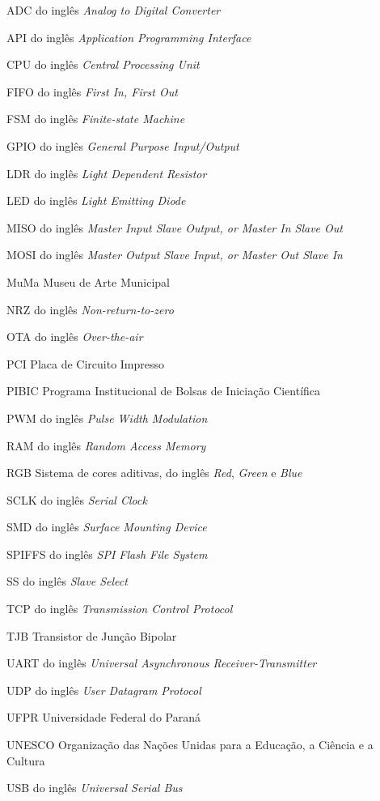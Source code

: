 \begin{siglas}
    \item[ADC] do inglês \emph{Analog to Digital Converter}
    \item[API] do inglês \emph{Application Programming Interface}
    \item[CPU] do inglês \emph{Central Processing Unit}
    \item[FIFO] do inglês \emph{First In, First Out}
    \item[FSM] do inglês \emph{Finite-state Machine}
    \item[GPIO] do inglês \emph{General Purpose Input/Output}
    \item[LDR] do inglês \emph{Light Dependent Resistor}
    \item[LED] do inglês \emph{Light Emitting Diode}
    \item[MISO] do inglês \emph{Master Input Slave Output, or Master In Slave Out}
    \item[MOSI] do inglês \emph{Master Output Slave Input, or Master Out Slave In}
    \item[MuMa] Museu de Arte Municipal
    \item[NRZ] do inglês \emph{Non-return-to-zero}
    \item[OTA] do inglês \emph{Over-the-air}
    \item[PCI] Placa de Circuito Impresso
    \item[PIBIC] Programa Institucional de Bolsas de Iniciação Científica
    \item[PWM] do inglês \emph{Pulse Width Modulation}
    \item[RAM] do inglês \emph{Random Access Memory}
    \item[RGB] Sistema de cores aditivas, do inglês \emph{Red}, \emph{Green} e \emph{Blue}
    \item[SCLK] do inglês \emph{Serial Clock}
    \item[SMD] do inglês \emph{Surface Mounting Device}
    \item[SPIFFS] do inglês \emph{SPI Flash File System}
    \item[SS] do inglês \emph{Slave Select}
    \item[TCP] do inglês \emph{Transmission Control Protocol}
    \item[TJB] Transistor de Junção Bipolar
    \item[UART] do inglês \emph{Universal Asynchronous Receiver-Transmitter}
    \item[UDP] do inglês \emph{User Datagram Protocol}
    \item[UFPR] Universidade Federal do Paraná
    \item[UNESCO] Organização das Nações Unidas para a Educação, a Ciência e a Cultura
    \item[USB] do inglês \emph{Universal Serial Bus}
\end{siglas}

